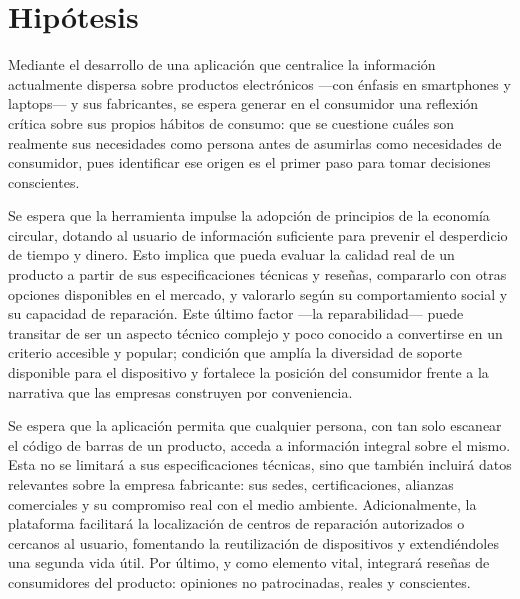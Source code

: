 \section{Hipótesis}


Mediante el desarrollo de una aplicación que centralice la información
actualmente dispersa sobre productos electrónicos —con énfasis en smartphones y
laptops— y sus fabricantes, se espera generar en el consumidor una reflexión
crítica sobre sus propios hábitos de consumo: que se cuestione cuáles son
realmente sus necesidades como persona antes de asumirlas como necesidades de
consumidor, pues identificar ese origen es el primer paso para tomar decisiones
conscientes. 

Se espera que la herramienta impulse la adopción de principios de la economía
circular, dotando al usuario de información suficiente para prevenir el
desperdicio de tiempo y dinero. Esto implica que pueda evaluar la calidad real
de un producto a partir de sus especificaciones técnicas y reseñas, compararlo
con otras opciones disponibles en el mercado, y valorarlo según su
comportamiento social y su capacidad de reparación. Este último factor —la
reparabilidad— puede transitar de ser un aspecto técnico complejo y poco
conocido a convertirse en un criterio accesible y popular; condición que amplía
la diversidad de soporte disponible para el dispositivo y fortalece la posición
del consumidor frente a la narrativa que las empresas construyen por
conveniencia. 

Se espera que la aplicación permita que cualquier persona, con tan solo escanear
el código de barras de un producto, acceda a información integral sobre el
mismo. Esta no se limitará a sus especificaciones técnicas, sino que también
incluirá datos relevantes sobre la empresa fabricante: sus sedes,
certificaciones, alianzas comerciales y su compromiso real con el medio
ambiente. Adicionalmente, la plataforma facilitará la localización de centros de
reparación autorizados o cercanos al usuario, fomentando la reutilización de
dispositivos y extendiéndoles una segunda vida útil. Por último, y como elemento
vital, integrará reseñas de consumidores del producto: opiniones no
patrocinadas, reales y conscientes. 

